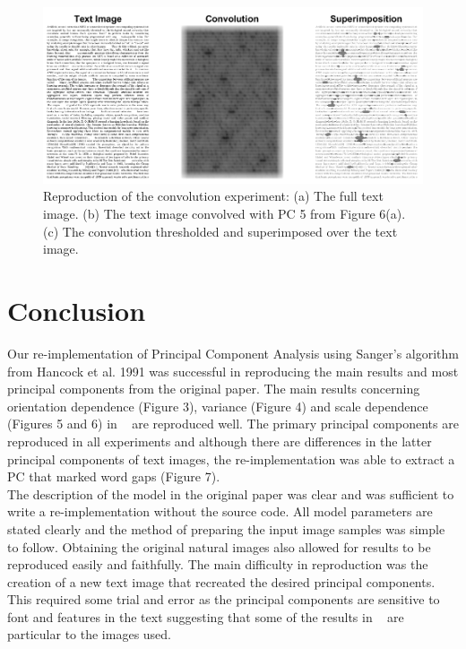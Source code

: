 \begin{figure}
    \centering
    \includegraphics[scale=0.55]{figures/Figure7.png}
    \caption{Reproduction of the convolution experiment: (a) The full text image. (b) The text image convolved with PC 5 from Figure 6(a). (c) The convolution thresholded and superimposed over the text image.}
    \label{fig:Figure7}
\end{figure}

\section{Conclusion}
Our re-implementation of Principal Component Analysis using Sanger's algorithm from Hancock et al. 1991 was successful in reproducing the main results and most principal components from the original paper. The main results concerning orientation dependence (Figure 3), variance (Figure 4) and scale dependence (Figures 5 and 6) in ~\cite{Hancock} are reproduced well. The primary principal components are reproduced in all experiments and although there are differences in the latter principal components of text images, the re-implementation was able to extract a PC that marked word gaps (Figure 7).\\
The description of the model in the original paper was clear and was sufficient to write a re-implementation without the source code. All model parameters are stated clearly and the method of preparing the input image samples was simple to follow. Obtaining the original natural images also allowed for results to be reproduced easily and faithfully. The main difficulty in reproduction was the creation of a new text image that recreated the desired principal components. This required some trial and error as the principal components are sensitive to font and features in the text suggesting that some of the results in ~\cite{Hancock} are particular to the images used.